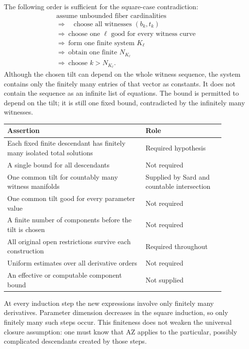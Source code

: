 \documentclass[11pt]{article}
\theoremstyle{definition}
\theoremstyle{remark}
\newcommand{\AZ}{\mathrm{AZ}}
\begin{document}
The following order is sufficient for the square-case contradiction:
\[
 \begin{gathered}
 \text{assume unbounded fiber cardinalities}\\
 \Longrightarrow\quad
 \text{choose all witnesses }(b_k,t_k)\\
 \Longrightarrow\
 \text{choose one }\ell\text{ good for every witness curve}\\
 \Longrightarrow\
 \text{form one finite system }K_\ell\\
 \Longrightarrow\
 \text{obtain one finite }N_{K_\ell}\\
 \Longrightarrow\
 \text{choose }k>N_{K_\ell}.
 \end{gathered}
\]
Although the chosen tilt can depend on the whole witness sequence,
the system contains only the finitely many entries of that vector
as constants. It does not contain the sequence as an infinite list
of equations. The bound is permitted to depend on the tilt; it is
still one fixed bound, contradicted by the infinitely many witnesses.

\begin{center}
\begin{tabular}{@{}p{0.57\linewidth}p{0.32\linewidth}@{}}
\toprule
Assertion & Role\\
\midrule
Each fixed finite descendant has finitely many isolated total solutions
& Required hypothesis\\[3pt]
A single bound for all descendants
& Not required\\[3pt]
One common tilt for countably many witness manifolds
& Supplied by Sard and countable intersection\\[3pt]
One common tilt good for every parameter value
& Not required\\[3pt]
A finite number of components before the tilt is chosen
& Not required\\[3pt]
All original open restrictions survive each construction
& Required throughout\\[3pt]
Uniform estimates over all derivative orders
& Not required\\[3pt]
An effective or computable component bound
& Not supplied\\
\bottomrule
\end{tabular}
\end{center}

At every induction step the new expressions involve only finitely
many derivatives. Parameter dimension decreases in the square
induction, so only finitely many such steps occur. This finiteness
does not weaken the universal closure assumption: one must know that
\(\AZ\) applies to the particular, possibly complicated descendants
created by those steps.
\end{document}
